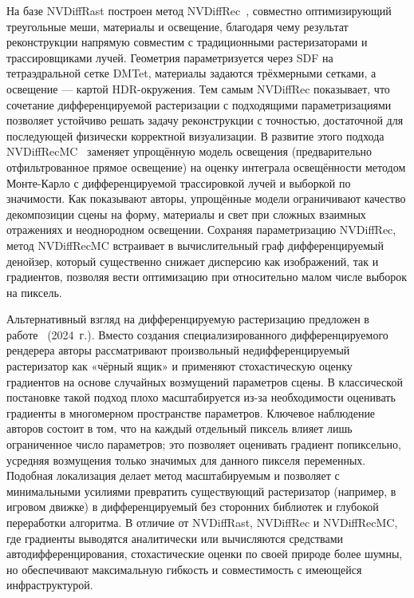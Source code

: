 На базе NVDiffRast построен метод NVDiffRec~\cite{NVDiffRec}, совместно
оптимизирующий треугольные меши, материалы и освещение, благодаря чему результат
реконструкции напрямую совместим с традиционными растеризаторами и
трассировщиками лучей. Геометрия параметризуется через SDF на тетраэдральной
сетке DMTet, материалы задаются трёхмерными сетками, а освещение --- картой
HDR-окружения. Тем самым NVDiffRec показывает, что сочетание дифференцируемой
растеризации с подходящими параметризациями позволяет устойчиво решать задачу
реконструкции с точностью, достаточной для последующей физически корректной
визуализации. В развитие этого подхода NVDiffRecMC~\cite{NVDiffRecMC} заменяет
упрощённую модель освещения (предварительно отфильтрованное прямое освещение)
на оценку интеграла освещённости методом Монте-Карло с дифференцируемой
трассировкой лучей и выборкой по значимости. Как показывают авторы, упрощённые
модели ограничивают качество декомпозиции сцены на форму, материалы и свет при
сложных взаимных отражениях и неоднородном освещении. Сохраняя параметризацию
NVDiffRec, метод NVDiffRecMC встраивает в вычислительный граф дифференцируемый
денойзер, который существенно снижает дисперсию как изображений, так и
градиентов, позволяя вести оптимизацию при относительно малом числе выборок на
пиксель.

Альтернативный взгляд на дифференцируемую растеризацию предложен в
работе~\cite{SGORast} (2024~г.). Вместо создания специализированного
дифференцируемого рендерера авторы рассматривают произвольный недифференцируемый
растеризатор как «чёрный ящик» и применяют стохастическую оценку градиентов на
основе случайных возмущений параметров сцены. В классической постановке такой
подход плохо масштабируется из-за необходимости оценивать градиенты в
многомерном пространстве параметров. Ключевое наблюдение авторов состоит в том,
что на каждый отдельный пиксель влияет лишь ограниченное число параметров; это
позволяет оценивать градиент попиксельно, усредняя возмущения только значимых
для данного пикселя переменных. Подобная локализация делает метод масштабируемым
и позволяет с минимальными усилиями превратить существующий растеризатор
(например, в игровом движке) в дифференцируемый без сторонних библиотек и
глубокой переработки алгоритма. В отличие от NVDiffRast, NVDiffRec и
NVDiffRecMC, где градиенты выводятся аналитически или вычисляются средствами
автодифференцирования, стохастические оценки по своей природе более шумны, но
обеспечивают максимальную гибкость и совместимость с имеющейся инфраструктурой.

